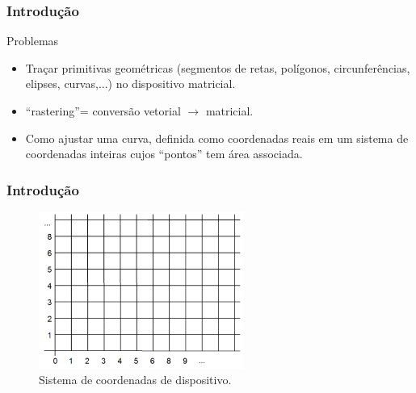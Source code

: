 \documentclass{beamer}
\begin{document}
\begin{frame}
\frametitle{Introdução}

		\begin{block}{Problemas}
		\begin{itemize}
			\item Traçar primitivas geométricas (segmentos de retas, polígonos, circunferências, elipses, curvas,...) no dispositivo matricial.
			\item ``rastering''= conversão vetorial $\to$ matricial.
			
			\item Como ajustar uma curva, definida como coordenadas reais em um sistema de coordenadas inteiras cujos ``pontos'' tem área associada. 						 
		\end{itemize}
	\end{block}
	
\end{frame}

\begin{frame}
\frametitle{Introdução}

		\begin{figure}[!h]
			\begin{center}
			\includegraphics[width=0.6\textwidth]{Figures/DevSisCoo}
			\caption{Sistema de coordenadas de dispositivo.}
			\end{center}
		\end{figure}
	
\end{frame}


\end{document}
